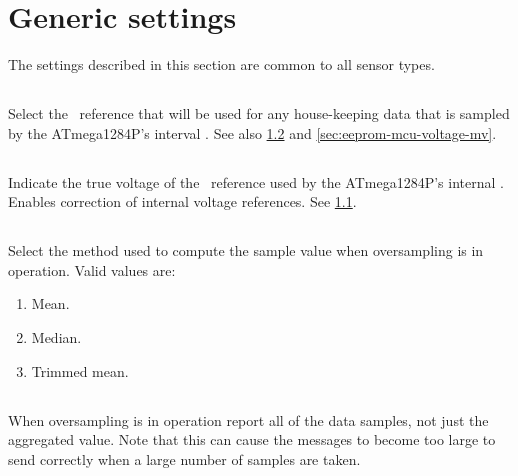 
\section{Generic settings}

The settings described in this section are common to all sensor types.

\subsection[adc-ref-type]{}
\label{sec:eeprom-adc-ref-type}

Select the \adc\ reference that will be used for any house-keeping
data that is sampled by the ATmega1284P's interval \adc. See also
\ref{sec:eeprom-adc-ref-voltage-mv} and
\ref{sec:eeprom-mcu-voltage-mv}.

\subsection[adc-ref-voltage-mv]{}
\label{sec:eeprom-adc-ref-voltage-mv}
Indicate the true voltage of the \adc\ reference used by the
ATmega1284P's internal \adc. Enables correction of internal voltage
references. See \ref{sec:eeprom-adc-ref-type}.

\subsection[aggregate]{}
\label{sec:eeprom-aggregate}
Select the method used to compute the sample value when oversampling
is in operation. Valid values are:
\begin{enumerate}
\item[0] Mean.
\item[1] Median.
\item[2] Trimmed mean.
\end{enumerate}

\subsection[all-samples]{}
\label{sec:eeprom-all-samples}
When oversampling is in operation report all of the data samples, not
just the aggregated value. Note that this can cause the messages to
become too large to send correctly when a large number of samples are
taken.

